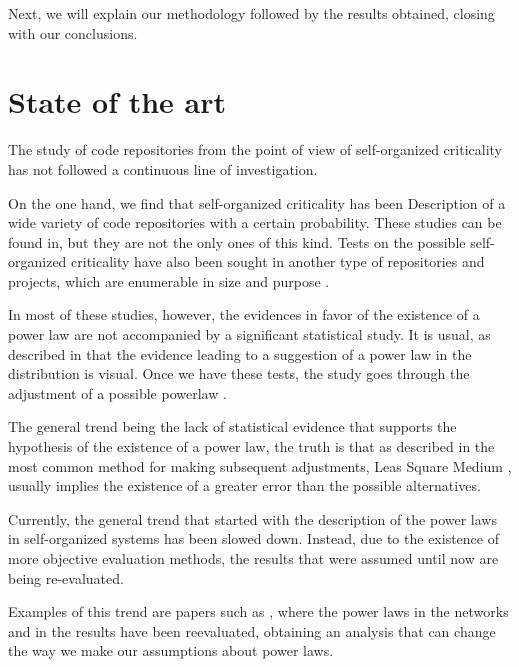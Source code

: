 \documentclass[conference]{IEEEtran}
\begin{document}
Next, we will explain our methodology followed by the results obtained,
closing with our conclusions. 



\section{State of the art}\label{soa}

The study of code repositories from the point of view of self-organized criticality has not followed a continuous line of investigation.

On the one hand, we find that self-organized criticality has been
Description of a wide variety of code repositories with a certain probability. These studies can be found in\cite{wu2007empirical,gorshenev2004punctuated}, but they are not the only ones of this kind. Tests on the possible self-organized criticality have also been sought in another type of repositories and projects, which are enumerable in size and purpose \cite{Merelo2016:repomining,merelo16:slash,merelo16:self,merelo2017self}.

In most of these studies, however, the evidences in favor of the existence of a power law are not accompanied by a significant statistical study. It is usual, as described in \cite{newman2005power} that the evidence leading to a suggestion of a power law in the distribution is visual. Once we have these tests, the study goes through the adjustment of a possible powerlaw \cite{merelo2017self,arafat2009commit}.

The general trend being the lack of statistical evidence that supports the hypothesis of the existence of a power law, the truth is that as described in \cite{newman2005power, clauset2009power} the most common method for making subsequent adjustments, Leas Square Medium \cite{merelo2017self,arafat2009commit,merelo16:self}, usually implies the existence of a greater error than the possible alternatives.

Currently, the general trend that started with the description of the power laws in self-organized systems has been slowed down. Instead, due to the existence of more objective evaluation methods, the results that were assumed until now are being re-evaluated.

Examples of this trend are papers such as \cite{Holme2019, Broido2019}, where the power laws in the networks and in the results have been reevaluated, obtaining an analysis that can change the way we make our assumptions about power laws.
\end{document}
